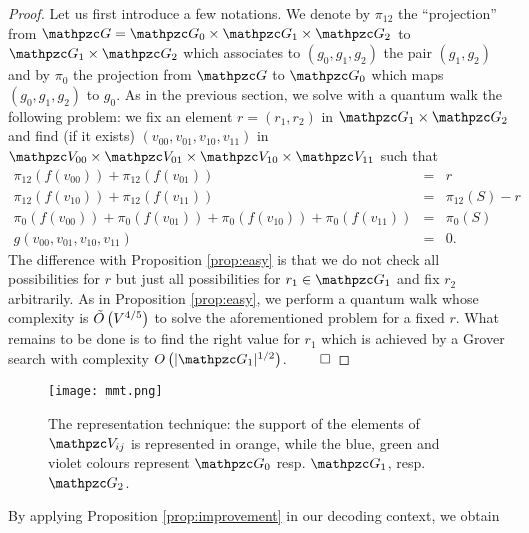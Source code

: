 \begin{proof}
Let us first introduce a few notations.
We denote by $\pi_{12}$ the ``projection'' from $\zG=\zG_0 \times \zG_1 \times \zG_2$ to 
$\zG_1 \times \zG_2$ which associates to $(g_0,g_1,g_2)$ the pair $(g_1,g_2)$
and by $\pi_0$ the projection from $\zG$ to $\zG_0$ which maps 
$(g_0,g_1,g_2)$ to $g_0$.
As in the previous section, we solve with a  quantum walk the following problem:
we fix an element $r=(r_1,r_2)$ in $\zG_1 \times \zG_2$ and
find (if it exists) $(v_{00},v_{01},v_{10},v_{11})$ in $\zV_{00}\times \zV_{01} \times \zV_{10} \times \zV_{11}$ such that 
\begin{eqnarray*}
\pi_{12}(f(v_{00})) +\pi_{12}(f(v_{01})) & = & r \\
\pi_{12}(f(v_{10}))  +\pi_{12}(f(v_{11})) & = & \pi_{12}(S)-r \\
\pi_0(f(v_{00})) + \pi_0(f(v_{01})) + \pi_0(f(v_{10})) + \pi_0(f(v_{11})) & = &\pi_0(S)\\
g(v_{00},v_{01},v_{10},v_{11}) & = & 0.
\end{eqnarray*}
The difference with Proposition \ref{prop:easy} is that we do not check all possibilities for $r$ but just all possibilities for $r_1 \in \zG_1$ and
fix $r_2$ arbitrarily. As in Proposition \ref{prop:easy}, we perform a quantum walk whose complexity is $\tilde{O}\left( V^{4/5} \right)$ to 
solve the aforementioned problem for a fixed $r$. 
What remains to be done is to find the right value for $r_1$ which is achieved by a Grover 
search with complexity $\OO{|\zG_1|^{1/2}}$.$~\qed$
\end{proof}
\begin{figure}[h]
    \centering
    \texttt{[image: mmt.png]}
    \caption{The representation technique: 
the support of the elements of $\zV_{ij}$ is represented in orange, while
the blue, green and violet colours represent $\zG_0$ resp. $\zG_1$, resp. $\zG_2$.}
    \label{fig:mmt}
\end{figure}
By  applying Proposition \ref{prop:improvement} in our decoding context, we obtain
